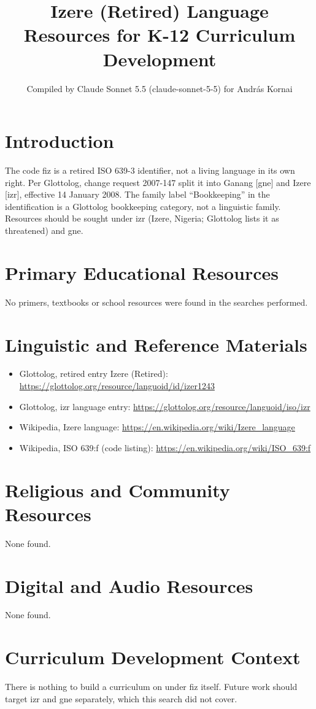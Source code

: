 \documentclass[12pt]{article}
\title{Izere (Retired) Language Resources for K-12 Curriculum Development}
\author{Compiled by Claude Sonnet 5.5 (claude-sonnet-5-5) for Andr\'as Kornai}
\date{}
\begin{document}
\maketitle

\section{Introduction}
The code fiz is a retired ISO 639-3 identifier, not a living language in its own right. Per Glottolog, change request 2007-147 split it into Ganang [gne] and Izere [izr], effective 14 January 2008. The family label ``Bookkeeping'' in the identification is a Glottolog bookkeeping category, not a linguistic family. Resources should be sought under izr (Izere, Nigeria; Glottolog lists it as threatened) and gne.

\section{Primary Educational Resources}
No primers, textbooks or school resources were found in the searches performed.

\section{Linguistic and Reference Materials}
\begin{itemize}
\item Glottolog, retired entry Izere (Retired): \url{https://glottolog.org/resource/languoid/id/izer1243}
\item Glottolog, izr language entry: \url{https://glottolog.org/resource/languoid/iso/izr}
\item Wikipedia, Izere language: \url{https://en.wikipedia.org/wiki/Izere_language}
\item Wikipedia, ISO 639:f (code listing): \url{https://en.wikipedia.org/wiki/ISO_639:f}
\end{itemize}

\section{Religious and Community Resources}
None found.

\section{Digital and Audio Resources}
None found.

\section{Curriculum Development Context}
There is nothing to build a curriculum on under fiz itself. Future work should target izr and gne separately, which this search did not cover.
\end{document}
